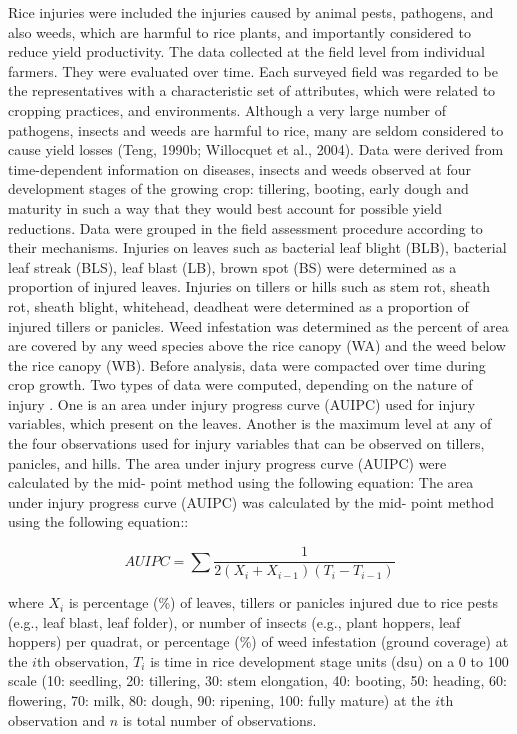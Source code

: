 Rice injuries were included the injuries caused by animal pests, pathogens, and also weeds, which are harmful to rice plants, and importantly considered to reduce yield productivity. The data collected at the field level from individual farmers. They were evaluated over time. Each surveyed field was regarded to be the representatives with a characteristic set of attributes, which were related to cropping practices, and environments. Although a very large number of pathogens, insects and weeds are harmful to rice, many are seldom considered to cause yield losses (Teng, 1990b; Willocquet et al., 2004). Data were derived from time-dependent information on diseases, insects and weeds observed at four development stages of the growing crop: tillering, booting, early dough and maturity in such a way that they would best account for possible yield reductions. Data were grouped in the field assessment procedure according to their mechanisms. Injuries on leaves such as bacterial leaf blight (BLB), bacterial leaf streak (BLS), leaf blast (LB), brown spot (BS) were determined as a proportion of injured leaves. Injuries on tillers or hills such as stem rot, sheath rot, sheath blight, whitehead, deadheat were determined as a proportion of injured tillers or panicles. Weed infestation was determined as the percent of area are covered by any weed species above the rice canopy (WA) and the weed below the rice canopy (WB). Before analysis, data were compacted over time during crop growth. Two types of data were computed, depending on the nature of injury . One is an area under injury progress curve (AUIPC) used for injury variables, which present on the leaves. Another is the maximum level at any of the four observations used for injury variables that can be observed on tillers, panicles, and hills. The area under injury progress curve (AUIPC) \citep{Campbell_1990_Introduction} were calculated by the mid- point method using the following equation: The area under injury progress curve (AUIPC) was calculated by the mid- point method using the following equation::

\begin{equation}
AUIPC = \sum{\frac{1}{2(X_{i} + X_{i-1})(T_{i} - T_{i-1})}}
\end{equation}

where $X_i$ is percentage (\%) of leaves, tillers or panicles injured due to rice pests (e.g., leaf blast, leaf folder), or number of insects (e.g., plant hoppers, leaf hoppers) per quadrat, or percentage (\%) of weed infestation (ground coverage) at the $i$th observation, $T_i$ is time in rice development stage units (dsu) on a 0 to 100 scale (10: seedling, 20: tillering, 30: stem elongation, 40: booting, 50: heading, 60: flowering, 70: milk, 80: dough, 90: ripening, 100: fully mature) at the $i$th observation and $n$ is total number of observations.

